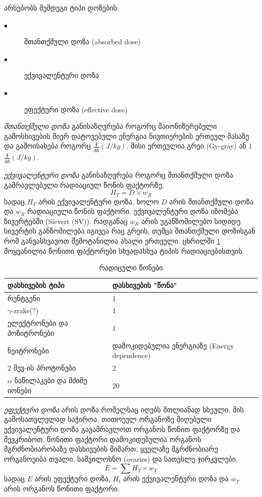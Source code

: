 \documentclass[12pt,a4paper,]{report}
\begin{document}
	არსებობს შემდეგი ტიპი დოზების:
	\begin{description}
      \item[$\bullet$] შთანთქმული დოზა  (absorbed dose)
      \item[$\bullet$] ექვივალენტური დოზა
      \item[$\bullet$] ეფექტური დოზა (effective dose)
    \end{description}
\textit{შთანთქმული დოზა} განისაზღვრება როგორც მაიონიზერებელი გამოსხივების მიერ დატოვებული ენერგია ნივთიერების ერთეულ მასაზე და გამოისახება როგორც $\frac{\text{ჯ}}{\text{კგ}} (J/kg)$. მისი ერთეულია გრეი (Gy-gray) ან 1$\frac{\text{ჯ}}{\text{კგ}} (J/kg)$.

\textit{ექვივალენტური დოზა} განისაზღვრება როგორც შთანთქმული დოზა გამრავლებული რადიაციულ წონის ფაქტორზე.
	\begin{equation}
		H_T = D \times w_R
	\end{equation}
სადაც $H_T$ არის ექვივალენტური დოზა, ხოლო $D$ არის შთანთქმული დოზა და $w_R$ რადიაციული წონის ფაქტორი. ექვივალენტური დოზა იზომება ზივერტებში (Sievert (SV)). რადგანაც $w_R$ არის უგანზომილებო სიდიდე სივერტის განზომილება იგივეა რაც გრეის, თუმცა შთანთქმული დოზისგან რომ განვასხვავოთ შემოტანილია ახალი ერთეული. ცხრილში \ref{tab:rad_weight_factor} მოყვანილია წონითი ფაქტორები სხვადასხვა ტიპის რადიაციებისთვის. 
    \begin{table}[h]
        \centering
        \begin{tabular}{l | l}
             დასხივების ტიპი & დასხივების "წონა" \\
             \hline
             \hline
             რენტგენი & 1 \\
             $\gamma$-zrake(?) & 1 \\
             ელექტრონები და პოზიტრონები & 1 \\
             ნეიტრონები & დამოკიდებულია ენერგიაზე (Energy dependence) \\
             2 მევ-ის პროტონები & 2 \\
             $\alpha$ ნაწილაკები და მძიმე იონები & 20 \\
        \end{tabular}
        \caption{რადიცული წონები}
        \label{tab:rad_weight_factor}
    \end{table}
\textit{ეფექტური დოზა} არის დოზა რომელსაც იღებს მთლიანად სხეული, მის გამოსათვლელად საჭიროა, თითოეულ ორგანოზე მიღებული ექვივალენტური დოზა გავამრავლოთ ორგანოს წონით ფაქტორზე და შევკრიბოთ. წონითი ფაქტორი დამოკიდებულია ორგანოს მგრძნობიარობაზე დასხივების მიმართ. ყველაზე მგრძნობიარე ორგანოეიბა თვალი, საშვილოსნო (ovaries) და სათესლე ჯირკვლები.
	\begin{equation}
		E = \sum H_T \times w_T
	\end{equation}
სადაც $E$ არის ეფექტური დოზა,  $H_t$ არის ექვივალენტური დოზა და $w_T$ არის ორგანოს წონითი ფაქტორი. 
\end{document}
